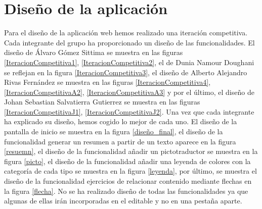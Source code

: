 \section{Diseño de la aplicación}
\label{disenyoDeLaAplicacion}
Para el diseño de la aplicación web hemos realizado una iteración competitiva. Cada integrante del grupo ha proporcionado un diseño de las funcionalidades. El diseño de Álvaro Gómez Sittima se muestra en las figuras \ref{IteracionCompetitiva1}, \ref{IteracionCompetitiva2}, el de Dunia Namour Doughani se reflejan en la figura \ref{IteracionCompetitiva3}, el diseño de Alberto Alejandro Rivas Fernández se muestra en las figuras \ref{IteracionCompetitiva4}, \ref{IteracionCompetitivaA2}, \ref{IteracionCompetitivaA3} y por el último, el diseño de Johan Sebastian Salvatierra Gutierrez se muestra en las figuras \ref{IteracionCompetitivaJ1}, \ref{IteracionCompetitivaJ2}. Una vez que cada integrante ha explicado su diseño, hemos cogido lo mejor de cada uno. El diseño de la pantalla de inicio se muestra en la figura \ref{diseño_final}, el diseño de la funcionalidad generar un resumen a partir de un texto aparece en la figura \ref{resuemn}, el diseño de la funcionalidad añadir un pictotraductor se muestra en la figura \ref{picto}, el diseño de la funcionalidad añadir una leyenda de colores con la categoría de cada tipo se muestra en la figura \ref{leyenda}, por último, se muestra el diseño de la funcionalidad ejercicios de relacionar contenido mediante flechas en la figura \ref{flecha}. No se ha realizado diseño de todas las funcionalidades ya que algunas de ellas irán incorporadas en el editable y no en una pestaña aparte.


